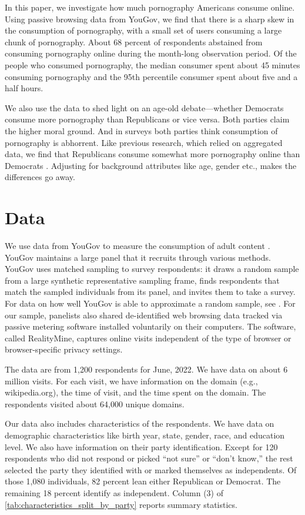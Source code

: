 \documentclass[12pt, letterpaper]{article}
\begin{document}
In this paper, we investigate how much pornography Americans consume online. Using passive browsing data from YouGov, we find that there is a sharp skew in the consumption of pornography, with a small set of users consuming a large chunk of pornography. About 68 percent of respondents abstained from consuming pornography online during the month-long observation period. Of the people who consumed pornography, the median consumer spent about 45 minutes consuming pornography and the 95th percentile consumer spent about five and a half hours. 

We also use the data to shed light on an age-old debate---whether Democrats consume more pornography than Republicans or vice versa. Both parties claim the higher moral ground. And in surveys both parties think consumption of pornography is abhorrent. Like previous research, which relied on aggregated data, we find that Republicans consume somewhat more pornography online than Democrats \citep{macinnis2015american, edelman2009markets}. Adjusting for background attributes like age, gender etc., makes the differences go away.

\section*{Data}\label{sec:data}
We use data from YouGov to measure the consumption of adult content \citep{data-dataverse}. YouGov maintains a large panel that it recruits through various methods. YouGov uses matched sampling to survey respondents: it draws a random sample from a large synthetic representative sampling frame, finds respondents that match the sampled individuals from its panel, and invites them to take a survey. For data on how well YouGov is able to approximate a random sample, see \citet{rivers2009}. For our sample, panelists also shared de-identified web browsing data tracked via passive metering software installed voluntarily on their computers. The software, called RealityMine, captures online visits independent of the type of browser or browser-specific privacy settings.

The data are from 1,200 respondents for June, 2022. We have data on about 6 million visits. For each visit, we have information on the domain (e.g., wikipedia.org), the time of visit, and the time spent on the domain. The respondents visited about 64,000 unique domains. 

Our data also includes characteristics of the respondents. We have data on demographic characteristics like birth year, state, gender, race, and education level. We also have information on their party identification. Except for 120 respondents who did not respond or picked ``not sure'' or ``don't know,'' the rest selected the party they identified with or marked themselves as independents. Of those 1,080 individuals, 82 percent lean either Republican or Democrat. The remaining 18 percent identify as independent. Column (3) of \cref{tab:characteristics_split_by_party} reports summary statistics.
\end{document}
